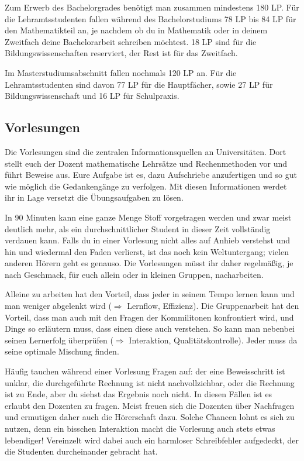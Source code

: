 Zum Erwerb des Bachelorgrades benötigt man zusammen mindestens 180 LP.
Für die Lehramtsstudenten fallen während des Bachelorstudiums
78 LP bis 84 LP für den Mathematikteil an,
je nachdem ob du in Mathematik oder in deinem Zweitfach
deine Bachelorarbeit schreiben möchtest.
18 LP sind für die Bildungswissenschaften reserviert,
der Rest ist für das Zweitfach.

Im Masterstudiumsabschnitt fallen nochmals 120 LP an.
Für die Lehramtsstudenten sind davon 77 LP für die Hauptfächer,
sowie 27 LP für Bildungswissenschaft und 16 LP für Schulpraxis.

\subsection{Vorlesungen}

Die Vorlesungen sind die zentralen Informationsquellen an Universitäten.
Dort stellt euch der Dozent mathematische Lehrsätze und
Rechenmethoden vor und führt Beweise aus.
Eure Aufgabe ist es,
dazu Aufschriebe anzufertigen und so gut wie möglich
die Gedankengänge zu verfolgen.
Mit diesen Informationen werdet ihr in Lage versetzt die Übungsaufgaben zu lösen.

In 90 Minuten kann eine ganze Menge Stoff vorgetragen werden
und zwar meist deutlich mehr, als ein durchschnittlicher Student
in dieser Zeit vollständig verdauen kann.
Falls du in einer Vorlesung nicht alles auf Anhieb verstehst und
hin und wiedermal den Faden verlierst,
ist das noch kein Weltuntergang;
vielen anderen Hörern geht es genauso.
Die Vorlesungen müsst ihr daher regelmäßig,
je nach Geschmack, für euch allein
oder in kleinen Gruppen, nacharbeiten.

Alleine zu arbeiten hat den Vorteil,
dass jeder in seinem Tempo lernen kann
und man weniger abgelenkt wird
($\Rightarrow$ \glqq Lernflow, Effizienz\grqq).
Die Gruppenarbeit hat den Vorteil,
dass man auch mit den Fragen der Kommilitonen konfrontiert wird,
und Dinge so erläutern muss, dass einen diese auch verstehen.
So kann man nebenbei seinen Lernerfolg überprüfen
($\Rightarrow$ \glqq Interaktion, Qualitätskontrolle\grqq).
Jeder muss da seine optimale Mischung finden.

Häufig tauchen während einer Vorlesung Fragen auf:
der eine Beweisschritt ist unklar,
die durchgeführte Rechnung ist nicht nachvollziehbar,
oder die Rechnung ist zu Ende, aber du siehst das Ergebnis noch nicht.
In diesen Fällen ist es erlaubt den Dozenten zu fragen.
Meist freuen sich die Dozenten über Nachfragen
und ermutigen daher auch die Hörerschaft dazu.
Solche Chancen lohnt es sich zu nutzen,
denn ein bisschen Interaktion macht die Vorlesung
auch stets etwas lebendiger!
Vereinzelt wird dabei auch ein harmloser Schreibfehler aufgedeckt,
der die Studenten durcheinander gebracht hat.

